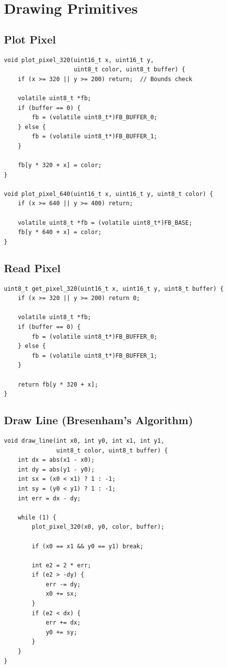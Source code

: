 \documentclass[11pt,letterpaper]{report}
\begin{document}
\section{Drawing Primitives}

\subsection{Plot Pixel}

\begin{lstlisting}[style=c,caption={Pixel Plotting Function}]
void plot_pixel_320(uint16_t x, uint16_t y, 
                    uint8_t color, uint8_t buffer) {
    if (x >= 320 || y >= 200) return;  // Bounds check
    
    volatile uint8_t *fb;
    if (buffer == 0) {
        fb = (volatile uint8_t*)FB_BUFFER_0;
    } else {
        fb = (volatile uint8_t*)FB_BUFFER_1;
    }
    
    fb[y * 320 + x] = color;
}

void plot_pixel_640(uint16_t x, uint16_t y, uint8_t color) {
    if (x >= 640 || y >= 400) return;
    
    volatile uint8_t *fb = (volatile uint8_t*)FB_BASE;
    fb[y * 640 + x] = color;
}
\end{lstlisting}

\subsection{Read Pixel}

\begin{lstlisting}[style=c,caption={Reading Pixel Values}]
uint8_t get_pixel_320(uint16_t x, uint16_t y, uint8_t buffer) {
    if (x >= 320 || y >= 200) return 0;
    
    volatile uint8_t *fb;
    if (buffer == 0) {
        fb = (volatile uint8_t*)FB_BUFFER_0;
    } else {
        fb = (volatile uint8_t*)FB_BUFFER_1;
    }
    
    return fb[y * 320 + x];
}
\end{lstlisting}

\subsection{Draw Line (Bresenham's Algorithm)}

\begin{lstlisting}[style=c,caption={Line Drawing}]
void draw_line(int x0, int y0, int x1, int y1, 
               uint8_t color, uint8_t buffer) {
    int dx = abs(x1 - x0);
    int dy = abs(y1 - y0);
    int sx = (x0 < x1) ? 1 : -1;
    int sy = (y0 < y1) ? 1 : -1;
    int err = dx - dy;
    
    while (1) {
        plot_pixel_320(x0, y0, color, buffer);
        
        if (x0 == x1 && y0 == y1) break;
        
        int e2 = 2 * err;
        if (e2 > -dy) {
            err -= dy;
            x0 += sx;
        }
        if (e2 < dx) {
            err += dx;
            y0 += sy;
        }
    }
}
\end{lstlisting}
\end{document}
